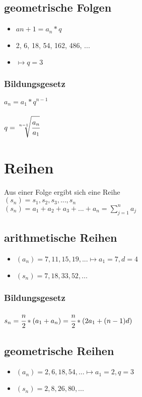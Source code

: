 \documentclass[a4paper,12pt]{scrartcl}
\begin{document}
\subsection{geometrische Folgen}
\begin{itemize}
\item $a{n+1} = a_n * q$
\item 2, 6, 18, 54, 162, 486, ...
\item $\mapsto q = 3$
\end{itemize}

\subsubsection{Bildungsgesetz}
$a_n = a_1 * q^{n - 1}$
\\ \\
$q = \sqrt[n-1]{\cfrac{a_n}{a_1}}$


\section{Reihen}
Aus einer Folge ergibt sich eine Reihe \\
$(s_n) = s_1, s_2, s_3, ..., s_n$ \\
$(s_n) = a_1 + a_2 + a_3 + ... + a_n = \sum\limits_{j=1}^n a_j$

\subsection{arithmetische Reihen}
\begin{itemize}
\item $(a_n) = 7, 11, 15, 19, ... \mapsto a_1 = 7, d = 4$ 
\item $(s_n) = 7, 18, 33, 52, ...$
\end{itemize}

\subsubsection{Bildungsgesetz}
$s_n = \cfrac{n}{2} * (a_1 + a_n) = \cfrac{n}{2} * (2a_1 + (n - 1)d)$

\subsection{geometrische Reihen}
\begin{itemize}
\item $(a_n) = 2, 6, 18, 54, ... \mapsto a_1 = 2, q = 3$ 
\item $(s_n) = 2, 8, 26, 80, ...$
\end{itemize}
\end{document}
